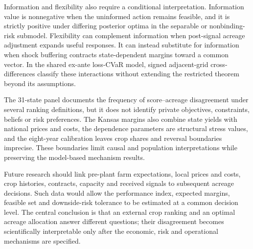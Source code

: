 Information and flexibility also require a conditional interpretation.
Information value is nonnegative when the uninformed action remains feasible,
and it is strictly positive under differing posterior optima in the separable
or nonbinding-risk submodel. Flexibility can complement information when
post-signal acreage adjustment expands useful responses. It can instead
substitute for information when shock buffering contracts state-dependent
margins toward a common vector. In the shared ex-ante loss-CVaR model, signed
adjacent-grid cross-differences classify these interactions without extending
the restricted theorem beyond its assumptions.

The 31-state panel documents the frequency of score--acreage disagreement
under several ranking definitions, but it does not identify private
objectives, constraints, beliefs or risk preferences. The Kansas margins also
combine state yields with national prices and costs, the dependence
parameters are structural stress values, and the eight-year calibration
leaves crop shares and reversal boundaries imprecise. These boundaries limit
causal and population interpretations while preserving the model-based
mechanism results.

Future research should link pre-plant farm expectations, local prices and
costs, crop histories, contracts, capacity and received signals to subsequent
acreage decisions. Such data would allow the performance index, expected
margins, feasible set and downside-risk tolerance to be estimated at a common
decision level. The central conclusion is that an external crop ranking and an
optimal acreage allocation answer different questions; their disagreement
becomes scientifically interpretable only after the economic, risk and
operational mechanisms are specified.
